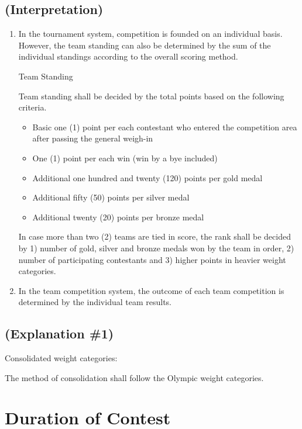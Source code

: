 \documentclass[
]{report}
\providecommand{\tightlist}{%
  \setlength{\itemsep}{0pt}\setlength{\parskip}{0pt}}
\renewcommand{\labelenumi}{\arabic{enumi}}
\begin{document}
\section{(Interpretation)}\label{interpretation-4}

\begin{enumerate}
\def\labelenumi{\arabic{enumi}.}
\item
  In the tournament system, competition is founded on an individual
  basis. However, the team standing can also be determined by the sum of
  the individual standings according to the overall scoring method.

  Team Standing

  Team standing shall be decided by the total points based on the
  following criteria.

  \begin{itemize}
  \tightlist
  \item
    Basic one (1) point per each contestant who entered the competition
    area after passing the general weigh-in
  \item
    One (1) point per each win (win by a bye included)
  \item
    Additional one hundred and twenty (120) points per gold medal
  \item
    Additional fifty (50) points per silver medal
  \item
    Additional twenty (20) points per bronze medal
  \end{itemize}

  In case more than two (2) teams are tied in score, the rank shall be
  decided by 1) number of gold, silver and bronze medals won by the team
  in order, 2) number of participating contestants and 3) higher points
  in heavier weight categories.
\item
  In the team competition system, the outcome of each team competition
  is determined by the individual team results.
\end{enumerate}

\section{(Explanation \#1)}\label{explanation-1-2}

Consolidated weight categories:

The method of consolidation shall follow the Olympic weight categories.

\chapter{Duration of Contest}\label{duration-of-contest}
\end{document}
